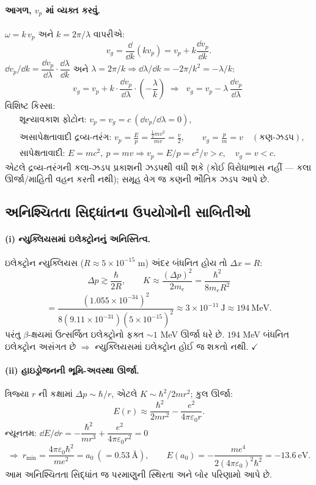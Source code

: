 \paragraph{આગળ, $v_p$ માં વ્યક્ત કરવું.} $\omega=k\,v_p$ અને $k=2\pi/\lambda$ વાપરીએ:
\[
v_g=\frac{\dd}{\dd k}(kv_p)=v_p+k\frac{\dd v_p}{\dd k}.
\]
$\dd v_p/\dd k=\dfrac{\dd v_p}{\dd\lambda}\cdot\dfrac{\dd\lambda}{\dd k}$ અને $\lambda=2\pi/k\Rightarrow\dd\lambda/\dd k=-2\pi/k^{2}=-\lambda/k$:
\[
v_g=v_p+k\cdot\frac{\dd v_p}{\dd\lambda}\cdot\left(-\frac{\lambda}{k}\right)
\;\Longrightarrow\;
\boxed{\;v_g=v_p-\lambda\,\frac{\dd v_p}{\dd\lambda}\;}
\]
વિશિષ્ટ કિસ્સા:
\begin{align*}
&\text{શૂન્યાવકાશ ફોટોન: } v_p=v_g=c\ (\dd v_p/\dd\lambda=0),\\
&\text{અસાપેક્ષતાવાદી દ્રવ્ય-તરંગ: } v_p=\frac{E}{p}=\frac{\tfrac12mv^2}{mv}=\frac{v}{2},\qquad
v_g=\frac{p}{m}=v\quad(\text{કણ-ઝડપ}),\\
&\text{સાપેક્ષતાવાદી: } E=mc^{2},\ p=mv\Rightarrow v_p=E/p=c^{2}/v>c,\quad v_g=v<c.
\end{align*}
એટલે દ્રવ્ય-તરંગની કલા-ઝડપ પ્રકાશની ઝડપથી વધી શકે (કોઈ વિરોધાભાસ નહીં — કલા ઊર્જા/માહિતી વહન કરતી નથી); સમૂહ વેગ જ કણની ભૌતિક ઝડપ આપે છે.

\subsection{અનિશ્ચિતતા સિદ્ધાંતના ઉપયોગોની સાબિતીઓ}

\paragraph{(i) ન્યુક્લિયસમાં ઇલેક્ટ્રોનનું અનિસ્તિત્વ.}
ઇલેક્ટ્રોન ન્યુક્લિયસ ($R\approx5\times10^{-15}$ m) અંદર બંધનિત હોય તો $\Delta x=R$:
\[
\Delta p\gtrsim\frac{\hbar}{2R},\qquad
K\approx\frac{(\Delta p)^{2}}{2m_e}=\frac{\hbar^{2}}{8m_eR^{2}}
\]
\[
=\frac{(1.055\times10^{-34})^{2}}{8(9.11\times10^{-31})(5\times10^{-15})^{2}}
\approx3\times10^{-11}\ \mathrm{J}\approx194\ \mathrm{MeV}.
\]
પરંતુ $\beta$-ક્ષયમાં ઉત્સર્જિત ઇલેક્ટ્રોનો ફક્ત $\sim1$ MeV ઊર્જા ધરે છે. $194$ MeV બંધનિત ઇલેક્ટ્રોન અસંગત છે $\Rightarrow$ ન્યુક્લિયસમાં ઇલેક્ટ્રોન હોઈ જ શકતો નથી. $\checkmark$

\paragraph{(ii) હાઇડ્રોજનની ભૂમિ-અવસ્થા ઊર્જા.}
ત્રિજ્યા $r$ ની કક્ષામાં $\Delta p\sim\hbar/r$, એટલે $K\sim\hbar^{2}/2mr^{2}$; કુલ ઊર્જા:
\[
E(r)\approx\frac{\hbar^{2}}{2mr^{2}}-\frac{e^{2}}{4\pi\varepsilon_0 r}.
\]
ન્યૂનતમ: $\dd E/\dd r=-\dfrac{\hbar^{2}}{mr^{3}}+\dfrac{e^{2}}{4\pi\varepsilon_0r^{2}}=0$
\[
\Rightarrow\ r_{\min}=\frac{4\pi\varepsilon_0\hbar^{2}}{me^{2}}=a_0\ (=0.53\ \text{Å}),
\qquad
E(a_0)=-\frac{me^{4}}{2(4\pi\varepsilon_0)^{2}\hbar^{2}}=-13.6\ \mathrm{eV}.
\]
આમ અનિશ્ચિતતા સિદ્ધાંત જ પરમાણુની સ્થિરતા અને બોર પરિણામો આપે છે.

